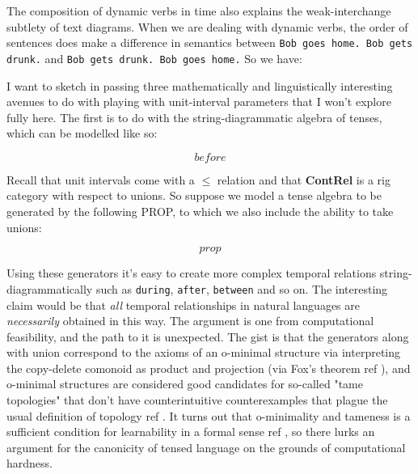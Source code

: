 \begin{example}

\end{example}

The composition of dynamic verbs in time also explains the weak-interchange subtlety of text diagrams. When we are dealing with dynamic verbs, the order of sentences does make a difference in semantics between \texttt{Bob goes home. Bob gets drunk.} and \texttt{Bob gets drunk. Bob goes home.} So we have:

\begin{example}

\end{example}


I want to sketch in passing three mathematically and linguistically interesting avenues to do with playing with unit-interval parameters that I won't explore fully here. The first is to do with the string-diagrammatic algebra of tenses, which can be modelled like so:

\[before\]

Recall that unit intervals come with a $\leq$ relation and that \textbf{ContRel} is a rig category with respect to unions. So suppose we model a tense algebra to be generated by the following PROP, to which we also include the ability to take unions:

\[prop\]

Using these generators it's easy to create more complex temporal relations string-diagrammatically such as \texttt{during}, \texttt{after}, \texttt{between} and so on. The interesting claim would be that \emph{all} temporal relationships in natural languages are \emph{necessarily} obtained in this way. The argument is one from computational feasibility, and the path to it is unexpected. The gist is that the generators along with union correspond to the axioms of an o-minimal structure via interpreting the copy-delete comonoid as product and projection (via Fox's theorem \bR ref \e), and o-minimal structures are considered good candidates for so-called "tame topologies" that don't have counterintuitive counterexamples that plague the usual definition of topology \bR ref \e. It turns out that o-minimality and tameness is a sufficient condition for learnability in a formal sense \bR ref \e, so there lurks an argument for the canonicity of tensed language on the grounds of computational hardness.\\


